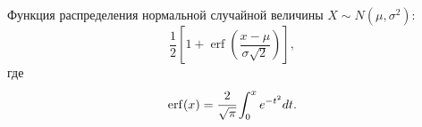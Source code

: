 Функция распределения нормальной случайной величины $X\sim N(\mu, \sigma^2)$:
\begin{equation}\label{eq:normcdf}
	\frac {1}{2}\left[1+\operatorname {erf} \left({\frac {x-\mu }{\sigma {\sqrt {2}}}}\right)\right],
\end{equation}
где
\begin{equation}\label{eq:erf}
	\operatorname {erf} (x)=\cfrac {2}{\sqrt {\pi}}\int_{0}^{x}e^{-t^2}dt.
\end{equation}

